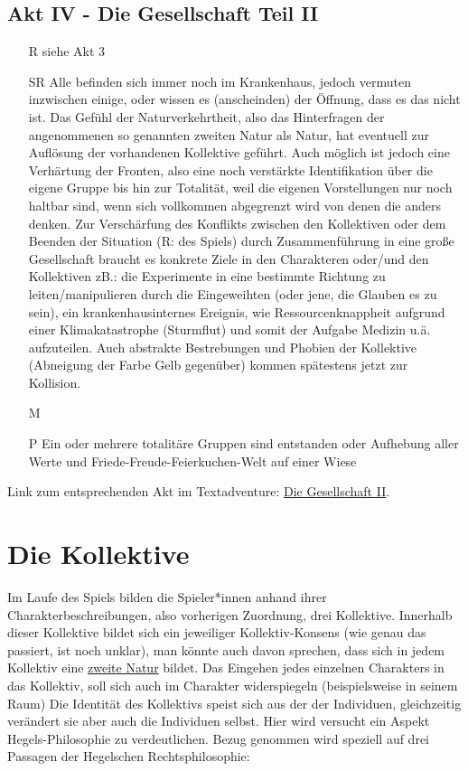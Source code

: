 \documentclass[12pt, a4paper, openany]{report}
\begin{document}
\subsection{Akt IV - Die Gesellschaft Teil II}
\begin{itemize} 
\item[R]siehe Akt 3
\item[SR] Alle befinden sich immer noch im Krankenhaus, jedoch vermuten inzwischen einige, oder wissen es (anscheinden) der Öffnung, dass es das nicht ist.
  Das Gefühl der Naturverkehrtheit, also das Hinterfragen der angenommenen so genannten zweiten Natur als Natur, hat eventuell zur Auflösung der vorhandenen Kollektive geführt. 
    Auch möglich ist jedoch eine Verhärtung der Fronten, also eine noch verstärkte Identifikation über die eigene Gruppe bis hin zur Totalität, weil die eigenen Vorstellungen nur noch haltbar sind, wenn sich vollkommen abgegrenzt wird von denen die anders denken. 
    Zur Verschärfung des Konflikts zwischen den Kollektiven oder dem Beenden der Situation (R: des Spiels) durch Zusammenführung in eine große Gesellschaft braucht es konkrete Ziele in den Charakteren oder/und den Kollektiven zB.: 
    die Experimente in eine bestimmte Richtung zu leiten/manipulieren durch die Eingeweihten (oder jene, die Glauben es zu sein), ein krankenhausinternes Ereignis, wie Ressourcenknappheit aufgrund einer Klimakatastrophe (Sturmflut) und somit der  Aufgabe Medizin u.ä. aufzuteilen. 
    Auch abstrakte Bestrebungen und Phobien der Kollektive (Abneigung der Farbe Gelb gegenüber) kommen spätestens jetzt zur Kollision. 
\item[M] 
\item[P]Ein oder mehrere totalitäre Gruppen sind entstanden oder Aufhebung aller Werte und Friede-Freude-Feierkuchen-Welt auf einer Wiese
\end{itemize}

Link zum entsprechenden Akt im Textadventure: \hyperref[die-gesellschaft2]{Die Gesellschaft II}.

\section{Die Kollektive}
Im Laufe des Spiels bilden die Spieler*innen anhand ihrer Charakterbeschreibungen, also vorherigen Zuordnung, drei Kollektive. 
Innerhalb dieser Kollektive bildet sich ein jeweiliger Kollektiv-Konsens (wie genau das passiert, ist noch unklar), man könnte auch davon sprechen, dass sich in jedem Kollektiv eine \hyperref[zweite-natur]{\glqq zweite Natur\grqq{}} bildet. 
Das Eingehen jedes einzelnen Charakters in das Kollektiv, soll sich auch im Charakter widerspiegeln (beispielsweise in seinem Raum) 
Die Identität des Kollektivs speist sich aus der der Individuen, gleichzeitig verändert sie aber auch die Individuen selbst. 
Hier wird versucht ein Aspekt Hegels-Philosophie zu verdeutlichen. 
Bezug genommen wird speziell auf drei Passagen der Hegelschen Rechtsphilosophie: \\
\end{document}
